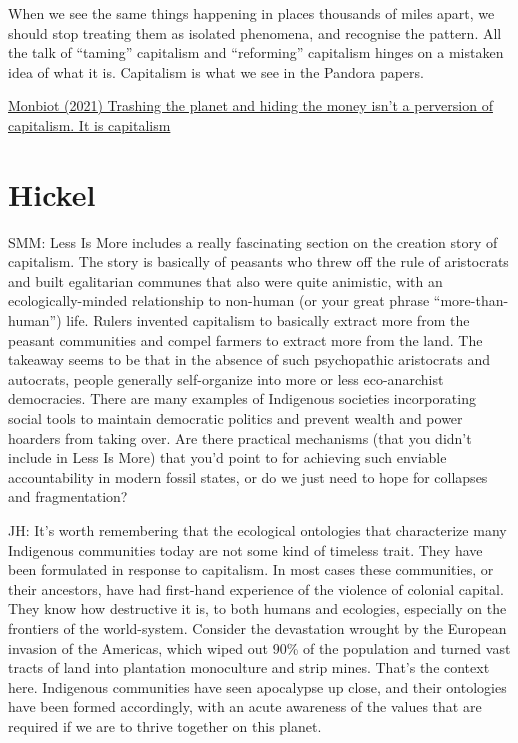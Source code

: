 \documentclass[
]{book}
\begin{document}
When we see the same things happening in places thousands of miles apart, we should stop treating them as isolated phenomena, and recognise the pattern. All the talk of ``taming'' capitalism and ``reforming'' capitalism hinges on a mistaken idea of what it is. Capitalism is what we see in the Pandora papers.

\href{https://www.theguardian.com/commentisfree/2021/oct/06/offshoring-wealth-capitalism-pandora-papers}{Monbiot (2021) Trashing the planet and hiding the money isn't a perversion of capitalism. It is capitalism}

\hypertarget{hickel}{%
\section{Hickel}\label{hickel}}

SMM: Less Is More includes a really fascinating section on the creation story of capitalism. The story is basically of peasants who threw off the rule of aristocrats and built egalitarian communes that also were quite animistic, with an ecologically-minded relationship to non-human (or your great phrase ``more-than-human'') life. Rulers invented capitalism to basically extract more from the peasant communities and compel farmers to extract more from the land. The takeaway seems to be that in the absence of such psychopathic aristocrats and autocrats, people generally self-organize into more or less eco-anarchist democracies. There are many examples of Indigenous societies incorporating social tools to maintain democratic politics and prevent wealth and power hoarders from taking over. Are there practical mechanisms (that you didn't include in Less Is More) that you'd point to for achieving such enviable accountability in modern fossil states, or do we just need to hope for collapses and fragmentation?

JH: It's worth remembering that the ecological ontologies that characterize many Indigenous communities today are not some kind of timeless trait. They have been formulated in response to capitalism. In most cases these communities, or their ancestors, have had first-hand experience of the violence of colonial capital. They know how destructive it is, to both humans and ecologies, especially on the frontiers of the world-system. Consider the devastation wrought by the European invasion of the Americas, which wiped out 90\% of the population and turned vast tracts of land into plantation monoculture and strip mines. That's the context here. Indigenous communities have seen apocalypse up close, and their ontologies have been formed accordingly, with an acute awareness of the values that are required if we are to thrive together on this planet.
\end{document}
